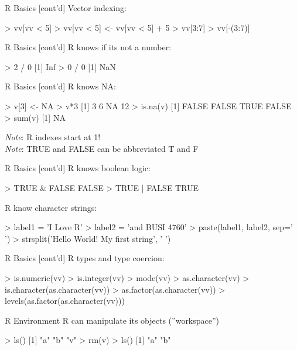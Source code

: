 \documentclass[ignorenonframetext,xcolor=x11names]{beamer}
\begin{document}
\begin{frame}[fragile]{R Basics \small [cont'd]}
Vector indexing:
\begin{Rcode}
> vv[vv < 5]
> vv[vv < 5] <- vv[vv < 5] + 5
> vv[3:7]
> vv[-(3:7)]
\end{Rcode}
\end{frame}

\begin{frame}[fragile]{R Basics \small [cont'd]}
R knows if its not a number:
\begin{Rcode}
> 2 / 0
[1] Inf
> 0 / 0
[1] NaN
\end{Rcode}
\end{frame}

\begin{frame}[fragile]{R Basics \small [cont'd]}
R knows NA:
\begin{Rcode}
> v[3] <- NA
> v*3
[1]  3  6 NA 12
> is.na(v)
[1] FALSE FALSE  TRUE FALSE
> sum(v)
[1] NA
\end{Rcode}
\emph{Note}: R indexes start at 1! \\
\emph{Note}: TRUE and FALSE can be abbreviated T and F \\
\end{frame}

\begin{frame}[fragile]{R Basics \small [cont'd]}
R knows boolean logic:
\begin{Rcode}
> TRUE & FALSE
FALSE
> TRUE | FALSE
TRUE
\end{Rcode}
R know character strings:
\begin{Rcode}
> label1 = 'I Love R'
> label2 = 'and BUSI 4760'
> paste(label1, label2, sep=' ')
> strsplit('Hello World! My first string', ' ')
\end{Rcode}
\end{frame}

\begin{frame}[fragile]{R Basics \small [cont'd]}
R types and type coercion:
\begin{Rcode}
> is.numeric(vv)
> is.integer(vv)
> mode(vv)
> as.character(vv)
> is.character(as.character(vv))
> as.factor(as.character(vv))
> levels(as.factor(as.character(vv)))
\end{Rcode}
\end{frame}

\begin{frame}[fragile]{R Environment}
R can manipulate its objects (''workspace'')
\begin{Rcode}
> ls()
[1] "a"          "b"          "v"
> rm(v)
> ls()
[1] "a"          "b"
\end{Rcode}
\end{frame}
\end{document}

